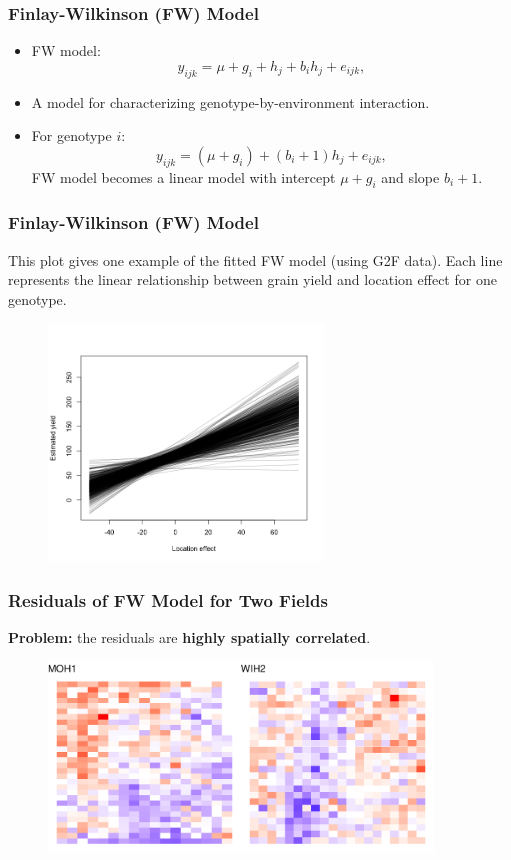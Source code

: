 \documentclass{beamer}
\begin{document}
\begin{frame}
	\frametitle{Finlay-Wilkinson (FW) Model}
	\begin{itemize}
	\item FW model: 
	$$y_{ijk} = \mu + g_i + h_j + b_i h_j + e_{ijk},$$
	\item A model for characterizing genotype-by-environment interaction.
 \item For genotype $i$:
 $$y_{ijk} = (\mu + g_i) +  (b_i + 1) h_j + e_{ijk},$$
 FW model becomes a linear model with intercept $\mu + g_i$ and slope $b_i + 1 $.
	\end{itemize}		
\end{frame}



\begin{frame}
\frametitle{Finlay-Wilkinson (FW) Model}
This plot gives one example of the fitted FW model (using G2F data). Each line represents the linear relationship between grain yield and location effect for one genotype.
	\begin{figure}[H]
		\centering
		\includegraphics[width = 0.65\textwidth]{image8.png}
	\end{figure}
\end{frame}




\begin{frame}
	\frametitle{Residuals of FW Model for Two Fields}
	\textbf{Problem:} the residuals are \textbf{highly spatially correlated}.
	\begin{figure}[H]
		\centering
		\includegraphics[width = 0.91\textwidth]{resid_plot_2.pdf}
	\end{figure}
\end{frame}
\end{document}
